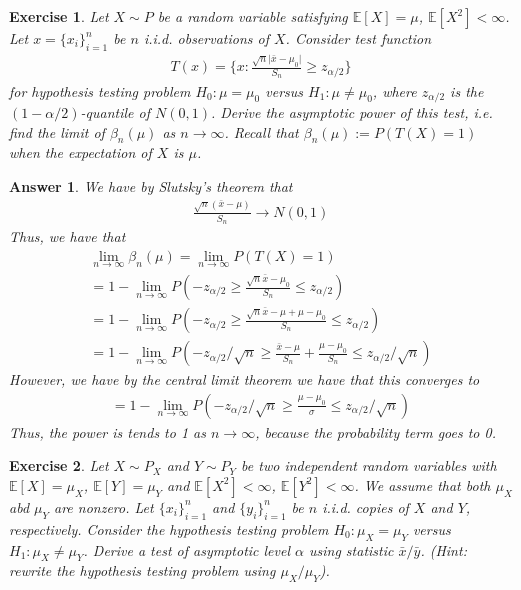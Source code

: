 \documentclass[12pt]{article}
\theoremstyle{colon}
\newtheorem{exercise}{Exercise}
\newtheorem*{answer}{Answer}
\begin{document}
\begin{exercise}
  Let $X \sim P$ be a random variable satisfying $\mathbb{E}[X] = \mu$, $\mathbb{E}[X^2] < \infty$. Let $x = \{ x_i \}_{i = 1}^n$ be $n$ i.i.d. observations of $X$. Consider test function
  \begin{gather*}
    T(x) = \{ x : \frac{\sqrt{n} \lvert \bar{x} - \mu_0 \rvert }{S_n} \geq z_{\alpha/2} \}
  \end{gather*}
  for hypothesis testing problem $H_0 : \mu = \mu_0$ versus $H_1 : \mu \neq \mu_0$, where $z_{\alpha/2}$ is the $(1 - \alpha/2)$-quantile of $N(0,1)$. Derive the asymptotic power of this test, i.e. find the limit of $\beta_n(\mu)$ as $n \rightarrow \infty$. Recall that $\beta_n(\mu) := P(T(X) = 1)$ when the expectation of $X$ is $\mu$.
\end{exercise}

\begin{answer}
  We have by Slutsky's theorem that
  \begin{gather*}
    \frac{\sqrt{n} (\bar{x} - \mu) }{S_n} \rightarrow N(0,1)
  \end{gather*}
  Thus, we have that
  \begin{gather*}
    \lim_{n \rightarrow \infty} \beta_n(\mu) = \lim_{n \rightarrow \infty} P(T(X) = 1) \\
    = 1 - \lim_{n \rightarrow \infty} P \left( -z_{\alpha/2} \geq \frac{\sqrt{n} \bar{x} - \mu_0}{S_n} \leq z_{\alpha/2} \right) \\
    = 1 - \lim_{n \rightarrow \infty} P \left( -z_{\alpha/2} \geq \frac{\sqrt{n} \bar{x} - \mu + \mu - \mu_0}{S_n} \leq z_{\alpha/2} \right) \\
    = 1 - \lim_{n \rightarrow \infty} P \left( -z_{\alpha/2}/\sqrt{n} \geq \frac{ \bar{x} - \mu }{S_n} + \frac{\mu - \mu_0}{S_n} \leq z_{\alpha/2}/\sqrt{n} \right)
  \end{gather*}
  However, we have by the central limit theorem we have that this converges to
  \begin{gather*}
    = 1 - \lim_{n \rightarrow \infty} P \left( -z_{\alpha/2}/\sqrt{n} \geq \frac{\mu - \mu_0}{\sigma} \leq z_{\alpha/2}/\sqrt{n} \right)
  \end{gather*}
  Thus, the power is tends to 1 as $n \rightarrow \infty$, because the probability term goes to 0.
\end{answer}

\clearpage

\begin{exercise}
  Let $X \sim P_X$ and $Y \sim P_Y$ be two independent random variables with $\mathbb{E}[X] = \mu_X$, $\mathbb{E}[Y] = \mu_Y$ and $\mathbb{E}[X^2] < \infty$, $\mathbb{E}[Y^2] < \infty$. We assume that both $\mu_X$ abd $\mu_Y$ are nonzero. Let $\{ x_i \}_{i=1}^n$ and $\{ y_i \}_{i=1}^n$ be $n$ i.i.d. copies of $X$ and $Y$, respectively. Consider the hypothesis testing problem $H_0 : \mu_X = \mu_Y$ versus $H_1 : \mu_X \neq \mu_Y$. Derive a test of asymptotic level $\alpha$ using statistic $\bar{x} / \bar{y}$. (Hint: rewrite the hypothesis testing problem using $\mu_X / \mu_Y$).
\end{exercise}
\end{document}
